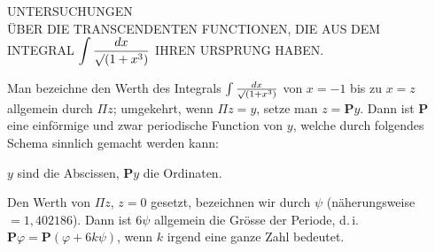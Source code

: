 \clearpage
{}%

\begin{center}
\large UNTERSUCHUNGEN\\
ÜBER DIE TRANSCENDENTEN FUNCTIONEN, DIE AUS DEM\\
INTEGRAL $\displaystyle\int \frac{dx}{\mathord{\surd}(1+x^3)}$ IHREN URSPRUNG HABEN.
\end{center}



\noindent\hspace*{\parindent}Man bezeichne den Werth des Integrals $\int \frac{dx}{\mathord{\surd}(1+x^3)}$ von $x=-1$ bis zu
$x=z$ allgemein durch $\Pi z$; umgekehrt, wenn $\Pi z=y$, setze man $z=\boldsymbol{P}y$.
Dann ist $\boldsymbol{P}$ eine einförmige und zwar periodische Function von $y$, welche
durch folgendes Schema sinnlich gemacht werden kann:

\begin{center}\end{center}

\noindent $y$ sind die Abscissen, $\boldsymbol{P}y$ die Ordinaten.

Den Werth von $\Pi z$, $z=0$ gesetzt, bezeichnen wir durch $\psi$ (näherungsweise
$=1{,}402186$). Dann ist $6\psi$ allgemein die Grösse der Periode, d.\,i.\
$\boldsymbol{P}\varphi=\boldsymbol{P}(\varphi+6k\psi)$, wenn $k$ irgend eine ganze Zahl
bedeutet.
